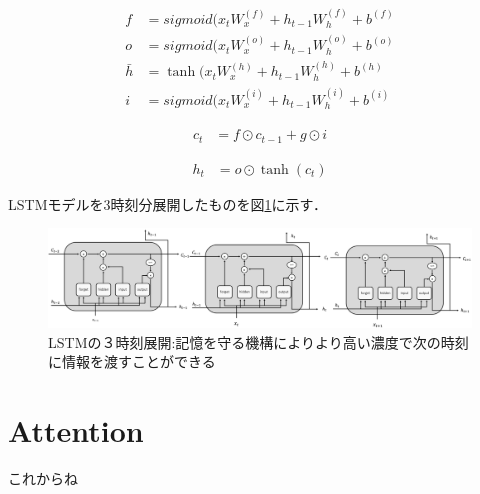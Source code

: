 \documentclass[a4j,11pt,report]{jsbook}
\begin{document}
\begin{equation}
  \label{eq:all}
  \begin{split}
    f &= sigmoid(x_{t}W_{x}^{(f)} + h_{t-1}W_{h}^{(f)} + b^{(f)} \\
    o &= sigmoid(x_{t}W_{x}^{(o)} + h_{t-1}W_{h}^{(o)} + b^{(o)} \\
    \bar{h} &= \tanh(x_{t}W_{x}^{(h)} + h_{t-1}W_{h}^{(h)} + b^{(h)} \\
    i &= sigmoid(x_{t}W_{x}^{(i)} + h_{t-1}W_{h}^{(i)} + b^{(i)}
  \end{split}
\end{equation}

\begin{equation}
  \label{eq:all2}
  \begin{split}
    c_{t} &= f \odot c_{t-1} + g \odot i
  \end{split}
\end{equation}

\begin{equation}
  \label{eq:all3}
  \begin{split}
    h_{t} &= o \odot \tanh(c_{t})
  \end{split}
\end{equation}

LSTMモデルを3時刻分展開したものを図\ref{fig:LSTM_3timeconcat}に示す．

\begin{center}
  \begin{figure}[H]
    \centering
    \includegraphics[width=\linewidth]{image/LSTM_concat.png}
    \caption{LSTMの３時刻展開:記憶を守る機構によりより高い濃度で次の時刻に情報を渡すことができる}
    \label{fig:LSTM_3timeconcat}
  \end{figure}
\end{center}


\chapter{Attention\label{ch:Attention}}
これからね
\fi
\end{document}
